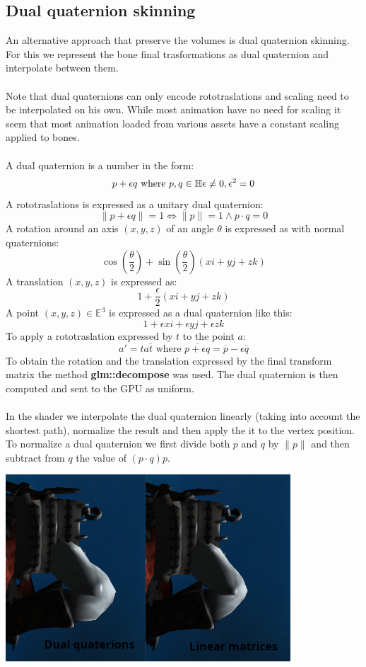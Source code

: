 \documentclass[12pt, a4paper]{article}
\begin{document}
\subsection{Dual quaternion skinning}
An alternative approach that preserve the volumes is dual quaternion skinning. For this we represent the bone final trasformations as dual quaternion
and interpolate between them.\\\\
Note that dual quaternions can only encode rototraslations and scaling need to be interpolated on his own. While most animation have no need for scaling
it seem that most animation loaded from various assets have a constant scaling applied to bones.\\\\
A dual quaternion is a number in the form:
\[
    p + \epsilon q \text{ where } p, q \in \mathbb{H}\\\\
    \epsilon \neq 0, \epsilon^2 = 0
\]
A rototraslations is expressed as a unitary dual quaternion:
\[
    \|p + \epsilon q\| = 1 \iff \|p\| = 1 \land p \cdot q = 0
\]
A rotation around an axis $(x, y, z)$ of an angle $\theta$ is expressed as with normal quaternions:
\[
    \cos(\frac{\theta}{2})+\sin(\frac{\theta}{2})(xi + yj + zk)
\]
A translation $(x, y, z)$ is expressed as:
\[
    1+\frac{\epsilon}{2}(xi + yj + zk)
\]
A point $(x, y, z) \in \mathbb{E}^3$ is expressed as a dual quaternion like this:
\[
    1 + \epsilon xi + \epsilon yj + \epsilon zk
\]
To apply a rototraslation expressed by $t$ to the point $a$:
\[
    a' = ta\overline{t} \text{ where } \overline{p + \epsilon q} = \overline{p} - \epsilon \overline{q}
\]
To obtain the rotation and the translation expressed by the final transform matrix the method \textbf{glm::decompose} was used.
The dual quaternion is then computed and sent to the GPU as uniform.\\\\
In the shader we interpolate the dual quaternion linearly (taking into account the shortest path), normalize the result and then apply the it to the vertex position.
To normalize a dual quaternion we first divide both $p$ and $q$ by $\|p\|$ and then subtract from $q$ the value of $(p \cdot q)p$.
\begin{center}
    \centering
    \includegraphics[width=0.8\textwidth]{img/dq.png}
\end{center}
\end{document}
